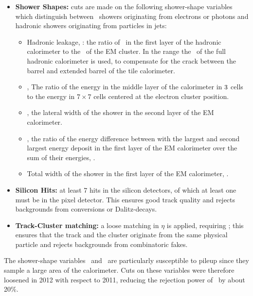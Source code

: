 \begin{itemize}

    \item {\bf Shower Shapes:} cuts are made on the following shower-shape
    variables which distinguish between \emag\ showers originating from
    electrons or photons and hadronic showers originating from particles in
    jets:

    \begin{itemize}
        \item Hadronic leakage, \Rhad: the ratio of \et\ in the first layer of
        the hadronic calorimeter to the \et\ of the EM cluster. In the range
         the \et\ of the full hadronic calorimeter is
        used, to compensate for the crack between the barrel and extended barrel
        of the tile calorimeter.
        \item \Reta, The ratio of the energy in the middle layer of the
        calorimeter in $3 \time 7$ cells to the energy in $7
        \times 7$ cells centered at the electron cluster position.
        \item \wetatwo, the lateral width of the shower in the second layer of the EM
        calorimeter.
        \item \Eratio, the ratio of the energy difference between with the largest and second
        largest energy deposit in the first layer of the EM calorimeter over the
        sum of their energies, .
        \item Total width of the shower in the first layer of the EM
        calorimeter, \wstot.
    \end{itemize}

    \item {\bf Silicon Hits:} at least 7 hits in the silicon detectors, of which at
    least one must be in the pixel detector. This ensures good track quality and
    rejects backgrounds from conversions or Dalitz-decays.

    \item {\bf Track-Cluster matching:} a loose matching in $\eta$ is applied,
    requiring ; this ensures that the track and the
    cluster originate from the same physical particle and rejects backgrounds
    from combinatoric fakes. 
\end{itemize}

The shower-shape variables \Reta\ and \Rhad\ are particularly susceptible to
pileup since they sample a large area of the calorimeter. Cuts on these
variables were therefore
loosened in 2012 with respect to 2011, reducing the rejection power of \loosePP\
by about 20\%.

